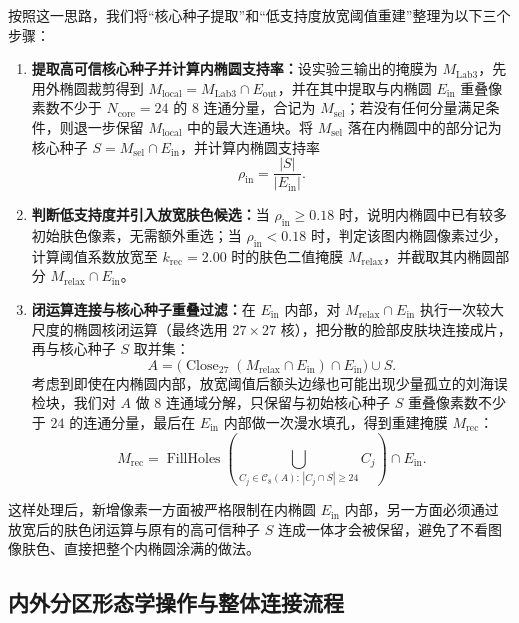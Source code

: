 按照这一思路，我们将“核心种子提取”和“低支持度放宽阈值重建”整理为以下三个步骤：
\begin{enumerate}
\item \textbf{提取高可信核心种子并计算内椭圆支持率：}设实验三输出的掩膜为 $M_{\text{Lab3}}$，先用外椭圆裁剪得到 $M_{\text{local}} = M_{\text{Lab3}} \cap E_{\text{out}}$，并在其中提取与内椭圆 $E_{\text{in}}$ 重叠像素数不少于 $N_{\text{core}}=24$ 的 8 连通分量，合记为 $M_{\text{sel}}$；若没有任何分量满足条件，则退一步保留 $M_{\text{local}}$ 中的最大连通块。将 $M_{\text{sel}}$ 落在内椭圆中的部分记为核心种子 $S = M_{\text{sel}} \cap E_{\text{in}}$，并计算内椭圆支持率
\begin{equation}
\rho_{\text{in}} = \frac{|S|}{|E_{\text{in}}|}.
\label{eq:innersupport}
\end{equation}
\item \textbf{判断低支持度并引入放宽肤色候选：}当 $\rho_{\text{in}} \ge 0.18$ 时，说明内椭圆中已有较多初始肤色像素，无需额外重选；当 $\rho_{\text{in}} < 0.18$ 时，判定该图内椭圆像素过少，计算阈值系数放宽至 $k_{\text{rec}}=2.00$ 时的肤色二值掩膜 $M_{\text{relax}}$，并截取其内椭圆部分 $M_{\text{relax}} \cap E_{\text{in}}$。
\item \textbf{闭运算连接与核心种子重叠过滤：}在 $E_{\text{in}}$ 内部，对 $M_{\text{relax}} \cap E_{\text{in}}$ 执行一次较大尺度的椭圆核闭运算（最终选用 $27\times27$ 核），把分散的脸部皮肤块连接成片，再与核心种子 $S$ 取并集：
\begin{equation}
A = \bigl(\operatorname{Close}_{27}(M_{\text{relax}}\cap E_{\text{in}})\cap E_{\text{in}}\bigr)\cup S.
\label{eq:allowmask}
\end{equation}
考虑到即使在内椭圆内部，放宽阈值后额头边缘也可能出现少量孤立的刘海误检块，我们对 $A$ 做 8 连通域分解，只保留与初始核心种子 $S$ 重叠像素数不少于 $24$ 的连通分量，最后在 $E_{\text{in}}$ 内部做一次漫水填孔，得到重建掩膜 $M_{\text{rec}}$：
\begin{equation}
M_{\text{rec}} = \operatorname{FillHoles}\!\left(\bigcup_{C_j\in\mathcal{C}_8(A):\,|C_j\cap S|\ge 24} C_j\right)\cap E_{\text{in}}.
\label{eq:lowsupport}
\end{equation}
\end{enumerate}

这样处理后，新增像素一方面被严格限制在内椭圆 $E_{\text{in}}$ 内部，另一方面必须通过放宽后的肤色闭运算与原有的高可信种子 $S$ 连成一体才会被保留，避免了不看图像肤色、直接把整个内椭圆涂满的做法。

\subsection{内外分区形态学操作与整体连接流程}


